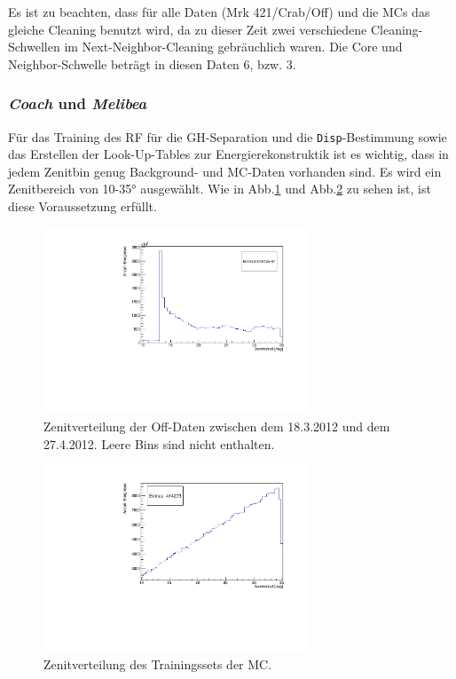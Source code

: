 Es ist zu beachten, dass für alle Daten (Mrk 421/Crab/Off) und die MCs das gleiche Cleaning benutzt wird, da zu dieser Zeit zwei verschiedene Cleaning-Schwellen im Next-Neighbor-Cleaning gebräuchlich waren.
Die Core und Neighbor-Schwelle beträgt in diesen Daten 6, bzw. 3.


\subsubsection{\textit{Coach} und \textit{Melibea}}
Für das Training des RF für die GH-Separation und die \texttt{Disp}-Bestimmung sowie das Erstellen der Look-Up-Tables zur Energierekonstruktik ist es wichtig, dass in jedem Zenitbin genug Background- und MC-Daten vorhanden sind.
Es wird ein Zenitbereich von 10-35° ausgewählt.
Wie in Abb.\ref{Datenset2_Zenitverteilung_Off} und Abb.\ref{Datenset2_Zenitverteilung_MC} zu sehen ist, ist diese Voraussetzung erfüllt.

\begin{figure}
    \centering
    \includegraphics[width=0.7\textwidth]{./Plots/04_MrkAnalyse/Datenset2/Datenset2_Background_MPointingPos1_fZd.pdf}
    \caption{Zenitverteilung der Off-Daten zwischen dem 18.3.2012 und dem 27.4.2012. Leere Bins sind nicht enthalten.}
    \label{Datenset2_Zenitverteilung_Off}
\end{figure}

\begin{figure}
    \centering
    \includegraphics[width=0.7\textwidth]{./Plots/04_MrkAnalyse/Datenset2/Datenset2_MC_MPointingPos1_fZd.pdf}
    \caption{Zenitverteilung des Trainingssets der MC.}
    \label{Datenset2_Zenitverteilung_MC}
\end{figure}

